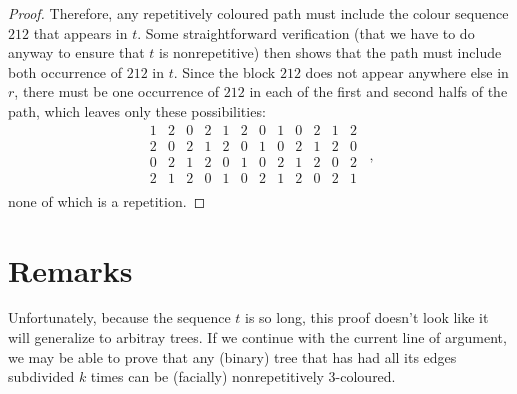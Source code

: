 \documentclass{patmorin}
\begin{document}
\begin{proof}
Therefore, any repetitively coloured path must include the colour sequence $212$ that appears in $t$.  Some straightforward verification (that we have to do anyway to ensure that $t$ is nonrepetitive) then shows that the path must include both occurrence of $212$ in $t$.  Since the block $212$ does not appear anywhere else in $r$, there must be one occurrence of $212$ in each of the first and second halfs of the path, which leaves only these possibilities:
\[
   \begin{array}{cccccc|cccccc}
       1 & 2 & 0 & 2 & 1 & 2 & 0 & 1 & 0 & 2 & 1 & 2 \\
       2 & 0 & 2 & 1 & 2 & 0 & 1 & 0 & 2 & 1 & 2 & 0 \\
       0 & 2 & 1 & 2 & 0 & 1 & 0 & 2 & 1 & 2 & 0 & 2 \\
       2 & 1 & 2 & 0 & 1 & 0 & 2 & 1 & 2 & 0 & 2 & 1 \\
   \end{array} \enspace,
\]
none of which is a repetition.
\end{proof}

\section{Remarks}

Unfortunately, because the sequence $t$ is so long, this proof doesn't
look like it will generalize to arbitray trees.  If we continue with
the current line of argument, we may be able to prove that any (binary)
tree that has had all its edges subdivided $k$ times can be (facially)
nonrepetitively 3-coloured.
\end{document}
